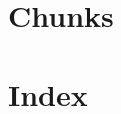 \newpage
\section{Chunks}
\nowebchunks

\section{Index}
\nowebindex




\newpage
\listoftodos[To-Do]
